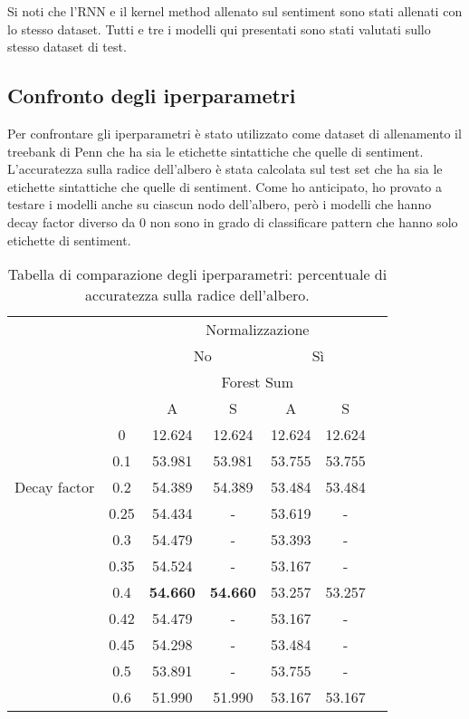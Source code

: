 Si noti che l'RNN e il kernel method allenato sul sentiment sono stati allenati
con lo stesso dataset. Tutti e tre i modelli qui presentati sono
stati valutati sullo stesso dataset di test.

\subsection{Confronto degli iperparametri}

Per confrontare gli iperparametri è stato utilizzato come dataset di allenamento
il treebank di Penn che ha sia le etichette sintattiche che quelle di sentiment.
L'accuratezza sulla radice dell'albero è stata calcolata sul test set che ha
sia le etichette sintattiche che quelle di sentiment. Come ho anticipato, ho
provato a testare i modelli anche su ciascun nodo dell'albero, però i modelli
che hanno decay factor diverso da 0 non sono in grado di classificare pattern
che hanno solo etichette di sentiment.

\begin{table}[h]
    \centering
    \begin{tabular}{cc|ccccc}
        \toprule
        \multicolumn{2}{c}{} & \multicolumn{4}{c}{Normalizzazione} \\
        \multicolumn{2}{c}{} & \multicolumn{2}{c}{No} & \multicolumn{2}{c}{Sì} \\
        \cmidrule{3-6}
        \multicolumn{2}{c}{} & \multicolumn{4}{c}{Forest Sum} \\
        \multicolumn{2}{c}{} & A & S & A & S \\
        \midrule
        \multirow{5}{*}{\begin{sideways}Decay factor\end{sideways}} & 0 & 12.624 & 12.624 & 12.624 & 12.624 \\
        & 0.1 & 53.981 & 53.981 & 53.755 & 53.755 \\
        & 0.2 & 54.389 & 54.389 & 53.484 & 53.484 \\
        & 0.25 & 54.434 & - & 53.619 & - \\
        & 0.3 & 54.479 & - & 53.393 & - \\
        & 0.35 & 54.524 & - & 53.167 & - \\
        & 0.4 & \textbf{54.660} & \textbf{54.660} & 53.257 & 53.257 \\
        & 0.42 & 54.479 & - & 53.167 & - \\
        & 0.45 & 54.298 & - & 53.484 & - \\
        & 0.5 & 53.891 & - & 53.755 & - \\
        & 0.6 & 51.990 & 51.990 & 53.167 & 53.167 \\
        \bottomrule
    \end{tabular}
    \caption{Tabella di comparazione degli iperparametri: percentuale di
    accuratezza sulla radice dell'albero.}
\end{table}
